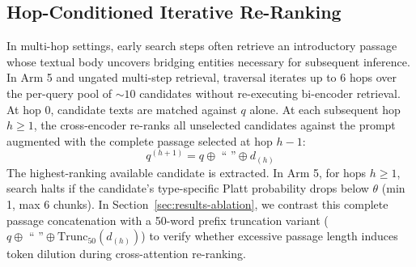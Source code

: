 \documentclass[conference]{IEEEtran}
\begin{document}
\subsection{Hop-Conditioned Iterative Re-Ranking}
In multi-hop settings, early search steps often retrieve an introductory passage whose textual body uncovers bridging entities necessary for subsequent inference. In Arm 5 and ungated multi-step retrieval, traversal iterates up to 6 hops over the per-query pool of $\sim 10$ candidates without re-executing bi-encoder retrieval. At hop 0, candidate texts are matched against $q$ alone. At each subsequent hop $h \ge 1$, the cross-encoder re-ranks all unselected candidates against the prompt augmented with the complete passage selected at hop $h-1$:
\begin{equation}
    q^{(h+1)} = q \oplus \text{ `` ''} \oplus d_{(h)}
\end{equation}
The highest-ranking available candidate is extracted. In Arm 5, for hops $h \ge 1$, search halts if the candidate's type-specific Platt probability drops below $\theta$ (min 1, max 6 chunks). In Section~\ref{sec:results-ablation}, we contrast this complete passage concatenation with a 50-word prefix truncation variant ($q \oplus \text{ `` ''} \oplus \text{Trunc}_{50}(d_{(h)})$) to verify whether excessive passage length induces token dilution during cross-attention re-ranking.
\end{document}
